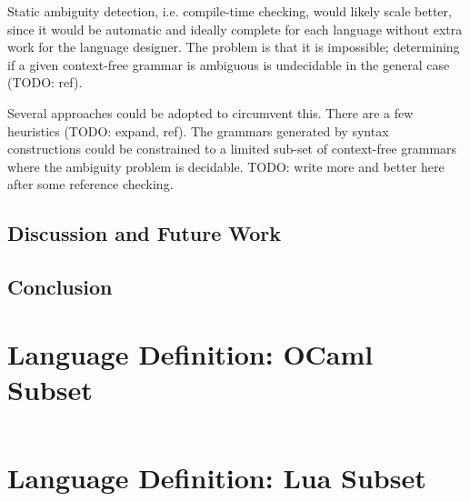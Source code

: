 \documentclass{kththesis}
\begin{document}
Static ambiguity detection, i.e. compile-time checking, would likely scale better, since it would be automatic and ideally complete for each language without extra work for the language designer. The problem is that it is impossible; determining if a given context-free grammar is ambiguous is undecidable in the general case (TODO: ref).

Several approaches could be adopted to circumvent this. There are a few heuristics (TODO: expand, ref). The grammars generated by syntax constructions could be constrained to a limited sub-set of context-free grammars where the ambiguity problem is decidable. TODO: write more and better here after some reference checking.

\section{Discussion and Future Work}

\section{Conclusion}

\printbibliography[heading=bibintoc]

\appendix

\chapter{Language Definition: OCaml Subset} \label{sec:appendix-ocaml}

\inputminted{text}{implementation/languages/ocaml/language}

\chapter{Language Definition: Lua Subset} \label{sec:appendix-lua}

\inputminted{text}{implementation/languages/lua/language}
\end{document}
